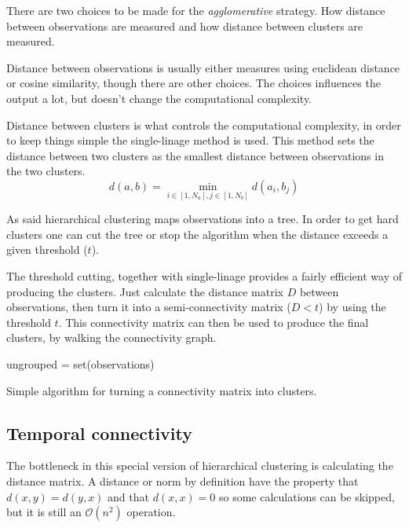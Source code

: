 There are two choices to be made for the \textit{agglomerative} strategy.  How distance between observations are measured and how distance between clusters are measured.

Distance between observations is usually either measures using euclidean distance or cosine similarity, though there are other choices. The choices influences the output a lot, but doesn't change the computational complexity.

Distance between clusters is what controls the computational complexity, in order to keep things simple the single-linage method is used. This method sets the distance between two clusters as the smallest distance between observations in the two clusters.
\begin{equation}
d(a, b) = \min_{i \in [1, N_a], j \in [1, N_b]} d(a_i, b_j)
\end{equation}

As said hierarchical clustering maps observations into a tree. In order to get hard clusters one can cut the tree or stop the algorithm when the distance exceeds a given threshold ($t$).

The threshold cutting, together with single-linage provides a fairly efficient way of producing the clusters. Just calculate the distance matrix $D$ between observations, then turn it into a semi-connectivity matrix ($D < t$) by using the threshold $t$. This connectivity matrix can then be used to produce the final clusters, by walking the connectivity graph.

\begin{algorithm}[h]
 \DontPrintSemicolon
 ungrouped = set(observations)\;
 \caption{Simple algorithm for turning a connectivity matrix into clusters.}
\end{algorithm}

\subsection{Temporal connectivity}

The bottleneck in this special version of hierarchical clustering is calculating the distance matrix. A distance or norm by definition have the property that $d(x,y) = d(y,x)$ and that $d(x,x) = 0$ so some calculations can be skipped, but it is still an $\mathcal{O}(n^2)$ operation.


